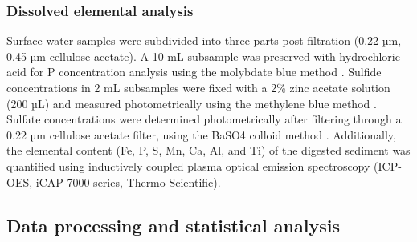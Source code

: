 \documentclass[12pt,twoside]{book}
\begin{document}
\begin{table}
\centering
\caption{\label{tab:IncubationSeqTable}Sequential extraction steps used in the experiment, based on the protocol of Wang et al. (2021).}
\centering
{}
\end{table}

\subsubsection{Dissolved elemental analysis}\label{dissolved-elemental-analysis}

Surface water samples were subdivided into three parts post-filtration (0.22 µm, 0.45 µm cellulose acetate). A 10 mL subsample was preserved with hydrochloric acid for P concentration analysis using the molybdate blue method \citep{Murphy1962}. Sulfide concentrations in 2 mL subsamples were fixed with a 2\% zinc acetate solution (200 µL) and measured photometrically using the methylene blue method \citep{Cline1969}. Sulfate concentrations were determined photometrically after filtering through a 0.22 µm cellulose acetate filter, using the BaSO4 colloid method \citep{Tabatabai1974}. Additionally, the elemental content (Fe, P, S, Mn, Ca, Al, and Ti) of the digested sediment was quantified using inductively coupled plasma optical emission spectroscopy (ICP-OES, iCAP 7000 series, Thermo Scientific).

\subsection{Data processing and statistical analysis}\label{data-processing-and-statistical-analysis}
\end{document}
